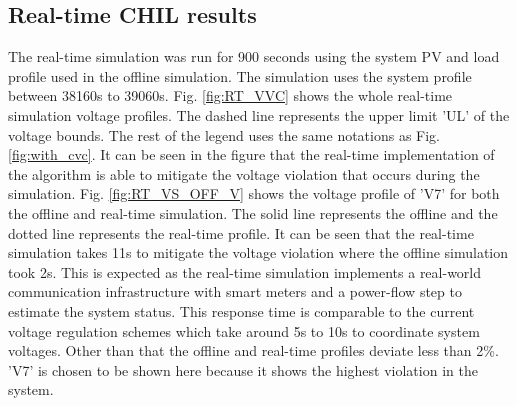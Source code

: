 \subsection{Real-time CHIL results}
The real-time simulation was run for 900 seconds using the system PV and load profile used in the offline simulation. The simulation uses the system profile between 38160s to 39060s. Fig. \ref{fig:RT_VVC} shows the whole real-time simulation voltage profiles. The dashed line represents the upper limit 'UL' of the voltage bounds. The rest of the legend uses the same notations as Fig.\ref{fig:with_cvc}. It can be seen in the figure that the real-time implementation of the algorithm is able to mitigate the voltage violation that occurs during the simulation. Fig. \ref{fig:RT_VS_OFF_V} shows the voltage profile of 'V7' for both the offline and real-time simulation. The solid line represents the offline and the dotted line represents the real-time profile. It can be seen that the real-time simulation takes 11s to mitigate the voltage violation where the offline simulation took 2s. This is expected as the real-time simulation implements a real-world communication infrastructure with smart meters and a power-flow step to estimate the system status. This response time is comparable to the current voltage regulation schemes which take around 5s to 10s to coordinate system voltages. Other than that the offline and real-time profiles deviate less than 2\%. 'V7' is chosen to be shown here because it shows the highest violation in the system. 

